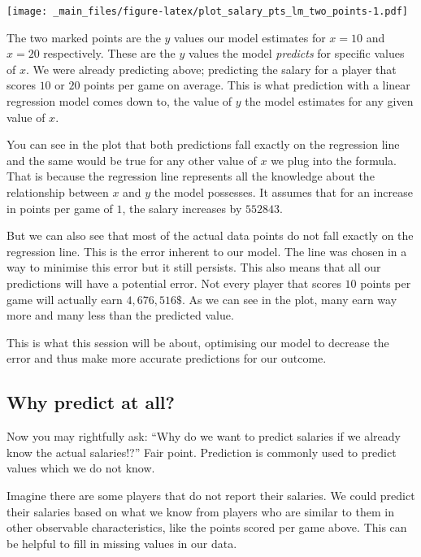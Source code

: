 \documentclass[
]{book}
\begin{document}
\texttt{[image: \_main\_files/figure-latex/plot\_salary\_pts\_lm\_two\_points-1.pdf]}

The two marked points are the \(y\) values our model estimates for \(x = 10\)
and \(x = 20\) respectively. These are the \(y\) values the model \emph{predicts} for
specific values of \(x\). We were already predicting above; predicting the salary
for a player that scores \(10\) or \(20\) points per game on average.
This is what prediction with a linear regression model comes down to, the value
of \(y\) the model estimates for any given value of \(x\).

You can see in the plot that both predictions fall exactly on the regression
line and the same would be true for any other value of \(x\) we plug into the
formula. That is because the regression line represents all the knowledge about
the relationship between \(x\) and \(y\) the model possesses. It assumes that for an
increase in points per game of \(1\), the salary increases by \(552843\).

But we can also see that most of the actual data points do not fall exactly on
the regression line. This is the error inherent to our model. The line was
chosen in a way to minimise this error but it still persists. This also means
that all our predictions will have a potential error. Not every player that
scores \(10\) points per game will actually earn \(4,676,516\$\). As we can see in
the plot, many earn way more and many less than the predicted value.

This is what this session will be about, optimising our model to decrease the
error and thus make more accurate predictions for our outcome.

\hypertarget{why-predict-at-all}{%
\subsection{Why predict at all?}\label{why-predict-at-all}}

Now you may rightfully ask: ``Why do we want to predict salaries if we already
know the actual salaries!?'' Fair point. Prediction is commonly used to predict
values which we do not know.

Imagine there are some players that do not report their salaries. We could
predict their salaries based on what we know from players who are similar to
them in other observable characteristics, like the points scored per game above.
This can be helpful to fill in missing values in our data.
\end{document}
